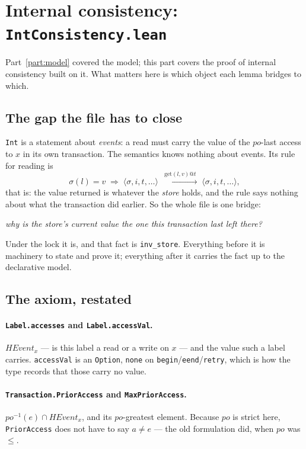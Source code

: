 \documentclass[11pt]{article}
\newcommand{\lean}[1]{\texttt{\small #1}}
\begin{document}
\section{Internal consistency: \texttt{IntConsistency.lean}}
\label{part:int}

\noindent
Part~\ref{part:model} covered the model; this part covers the proof of internal
consistency built on it. What matters here is which object each lemma bridges to
which.

\subsection{The gap the file has to close}

\lean{Int} is a statement about \emph{events}: a read must carry the value of the
$po$-last access to $x$ in its own transaction. The semantics knows nothing about
events. Its rule for reading is
\[
  \sigma(l) = v \;\Longrightarrow\;
  \langle \sigma, i, t, \ldots\rangle \;\xrightarrow{\ \mathrm{get}(l,v)@t\ }\;
  \langle \sigma, i, t, \ldots\rangle,
\]
that is: the value returned is whatever the \emph{store} holds, and the rule says
nothing about what the transaction did earlier. So the whole file is one bridge:
\begin{center}
  \emph{why is the store's current value the one this transaction last left there?}
\end{center}
Under the lock it is, and that fact is \lean{inv\_store}. Everything before it is
machinery to state and prove it; everything after it carries the fact up to the
declarative model.

\subsection{The axiom, restated}

\paragraph{\lean{Label.accesses} and \lean{Label.accessVal}.}
$HEvent_x$ --- is this label a read or a write on $x$ --- and the value such a
label carries. \lean{accessVal} is an \lean{Option}, \lean{none} on
\lean{begin}/\lean{eend}/\lean{retry}, which is how the type records that those
carry no value.

\paragraph{\lean{Transaction.PriorAccess} and \lean{MaxPriorAccess}.}
$po^{-1}(e) \cap HEvent_x$, and its $po$-greatest element. Because $po$ is strict
here, \lean{PriorAccess} does not have to say $a \neq e$ --- the old
formulation did, when $po$ was $\leq$.
\end{document}
